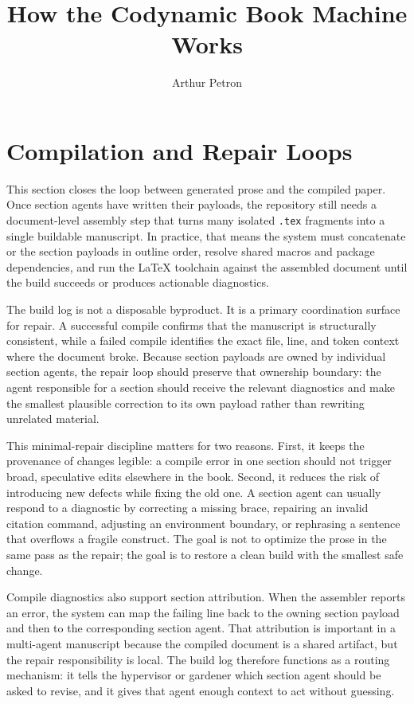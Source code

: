 \documentclass[11pt]{article}
\title{How the Codynamic Book Machine Works}
\author{Arthur Petron}
\begin{document}
\section*{Compilation and Repair Loops}

This section closes the loop between generated prose and the compiled paper. Once section agents have written their payloads, the repository still needs a document-level assembly step that turns many isolated \texttt{.tex} fragments into a single buildable manuscript. In practice, that means the system must concatenate or \texttt{} the section payloads in outline order, resolve shared macros and package dependencies, and run the LaTeX toolchain against the assembled document until the build succeeds or produces actionable diagnostics.

The build log is not a disposable byproduct. It is a primary coordination surface for repair. A successful compile confirms that the manuscript is structurally consistent, while a failed compile identifies the exact file, line, and token context where the document broke. Because section payloads are owned by individual section agents, the repair loop should preserve that ownership boundary: the agent responsible for a section should receive the relevant diagnostics and make the smallest plausible correction to its own payload rather than rewriting unrelated material.

This minimal-repair discipline matters for two reasons. First, it keeps the provenance of changes legible: a compile error in one section should not trigger broad, speculative edits elsewhere in the book. Second, it reduces the risk of introducing new defects while fixing the old one. A section agent can usually respond to a diagnostic by correcting a missing brace, repairing an invalid citation command, adjusting an environment boundary, or rephrasing a sentence that overflows a fragile construct. The goal is not to optimize the prose in the same pass as the repair; the goal is to restore a clean build with the smallest safe change.

Compile diagnostics also support section attribution. When the assembler reports an error, the system can map the failing line back to the owning section payload and then to the corresponding section agent. That attribution is important in a multi-agent manuscript because the compiled document is a shared artifact, but the repair responsibility is local. The build log therefore functions as a routing mechanism: it tells the hypervisor or gardener which section agent should be asked to revise, and it gives that agent enough context to act without guessing.
\end{document}
